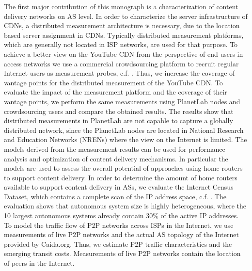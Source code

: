 
The first major contribution of this monograph is a characterization of content delivery networks on AS level.
In order to characterize the server infrastructure of CDNs, a distributed measurement architecture is necessary, due to the location based server assignment in CDNs.
Typically distributed measurement platforms, which are generally not located in ISP networks, are used for that purpose.
To achieve a better view on the YouTube CDN from the perspective of end users in access networks we use a commercial crowdsourcing platform to recruit regular Internet users as measurement probes, c.f. \cite{burger2014vantage}.
Thus, we increase the coverage of vantage points for the distributed measurement of the YouTube CDN.
To evaluate the impact of the measurement platform and the coverage of their vantage points, we perform the same measurements using PlanetLab nodes and crowdsourcing users and compare the obtained results.
The results show that distributed measurements in PlanetLab are not capable to capture a globally distributed network, since the PlanetLab nodes are located in National Research and Education Networks (NRENs) where the view on the Internet is limited.
The models derived from the measurement results can be used for performance analysis and optimization of content delivery mechanisms.
In particular the models are used to assess the overall potential of approaches using home routers to support content delivery.
In order to determine the amount of home routers available to support content delivery in ASs, we evaluate the Internet Census Dataset, which contains a complete scan of the IP address space, c.f. \cite{burger2016hierarchical}.
The evaluation shows that autonomous system size is highly heterogeneous, where the 10 largest autonomous systems already contain 30\% of the active IP addresses.
To model the traffic flow of P2P networks across ISPs in the Internet, we use measurements of live P2P networks and the actual AS topology of the Internet provided by Caida.org.
Thus, we estimate P2P traffic characteristics and the emerging transit costs.
Measurements of live P2P networks contain the location of peers in the Internet.
